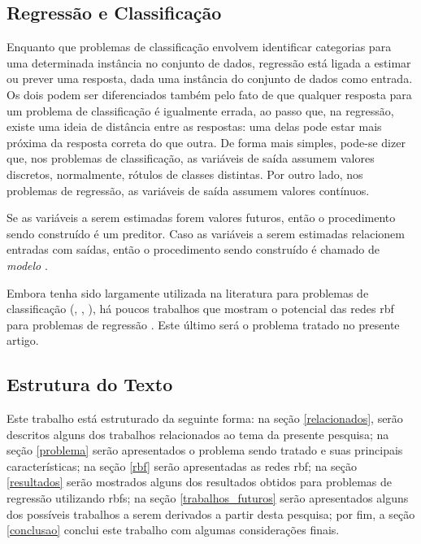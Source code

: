 \documentclass[conference]{IEEEtran}
\begin{document}
\subsection{Regressão e Classificação}
\label{regressaoxclassificacao}

Enquanto que problemas de classificação envolvem identificar categorias para 
uma determinada instância no conjunto de dados, regressão está ligada a estimar 
ou prever uma resposta, dada uma instância do conjunto de dados como entrada. 
Os dois podem ser diferenciados também pelo fato de que qualquer resposta 
para um problema de classificação é igualmente errada, ao passo que, na 
regressão, existe uma ideia de distância entre as respostas: uma delas pode 
estar mais próxima da resposta correta do que outra. De forma mais simples, 
pode-se dizer que, nos problemas de classificação, as variáveis de saída 
assumem valores discretos, normalmente, rótulos de classes distintas. Por outro 
lado, nos problemas de regressão, as variáveis de saída assumem valores 
contínuos.

Se as variáveis a serem estimadas forem valores futuros, então o procedimento 
sendo construído é um preditor. Caso as variáveis a serem estimadas relacionem 
entradas com saídas, então o procedimento sendo construído é chamado de 
\textit{modelo} \cite{specht1991general}.

Embora tenha sido largamente utilizada na literatura para problemas de 
classificação (\cite{heartrbf}, \cite{wu2012using}, 
\cite{DBLP:conf/isnn/ZhaoYWWL06}), há poucos trabalhos que mostram o potencial 
das redes \ac*{rbf} para problemas de regressão \cite{rojas2002time}. Este 
último será o problema tratado no presente artigo.

\subsection{Estrutura do Texto}
\label{estrutura}

Este trabalho está estruturado da seguinte forma: na seção \ref{relacionados}, 
serão descritos alguns dos trabalhos relacionados ao tema da presente pesquisa; 
na seção \ref{problema} serão apresentados o problema sendo tratado e suas 
principais características; na seção \ref{rbf} serão apresentadas as redes 
\ac*{rbf}; na seção \ref{resultados} serão mostrados alguns dos resultados 
obtidos para problemas de regressão utilizando \acp*{rbf}; na seção 
\ref{trabalhos_futuros} serão apresentados alguns dos possíveis trabalhos a 
serem derivados a partir desta pesquisa; por fim, a seção \ref{conclusao} 
conclui este trabalho com algumas considerações finais.
\end{document}
